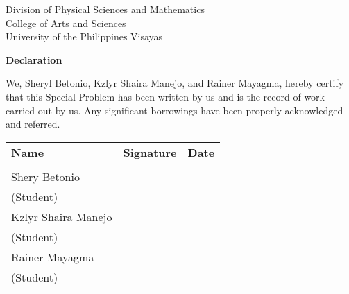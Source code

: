 \begin{center}
	Division of Physical Sciences and Mathematics\\
	College of Arts and Sciences\\
	University of the Philippines Visayas 
	
		\textbf{Declaration}
		\end{center}

We,  Sheryl Betonio, Kzlyr Shaira Manejo, and Rainer Mayagma, hereby certify that this Special Problem has been written by us  and is the record of work carried out by us. Any significant borrowings have been properly acknowledged and referred.

	\begin{tabular}{lll}
	\bfseries Name  & \bfseries Signature & \bfseries Date\\ \\
	Shery Betonio &\signaturerule  & \signaturerule\\ 
	\multicolumn{1}{l}{(Student)} \\ 
	Kzlyr Shaira Manejo &\signaturerule  & \signaturerule\\ 
	\multicolumn{1}{l}{(Student)} \\
	Rainer Mayagma &\signaturerule  & \signaturerule\\ 
\multicolumn{1}{l}{(Student)} \\

\end{tabular}



